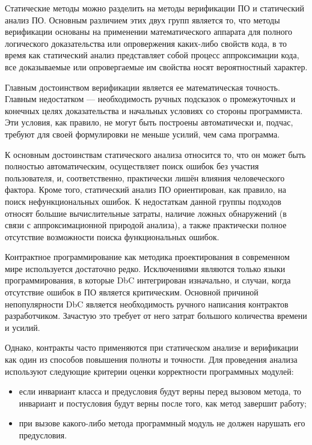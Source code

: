 Статические методы можно разделить на методы верификации ПО и статический анализ ПО. Основным различием этих двух групп является то, что методы верификации основаны на применении математического аппарата для полного логического доказательства или опровержения каких-либо свойств кода, в то время как статический анализ представляет собой процесс аппроксимации кода, все доказываемые или опровергаемые им свойства носят вероятностный характер.

Главным достоинством верификации является ее математическая точность. Главным недостатком --- необходимость ручных подсказок о промежуточных и конечных целях доказательства и начальных условиях со стороны программиста. Эти условия, как правило, не могут быть построены ав­томатически и, подчас, требуют для своей формулировки не меньше усилий, чем сама программа.

К основным достоинствам статического анали­за относится то, что он может быть полностью автоматическим, осуществляет поиск ошибок без участия пользователя, и, соответствен­но, практически лишён влияния человеческого фактора. Кроме того, статический анализ ПО ориентирован, как правило, на поиск нефункциональных ошибок. К недостаткам данной группы подходов относят большие вычислительные затраты, наличие ложных обнаружений (в связи с аппроксимационной природой анализа), а также практически полное отсутствие возможности поиска функциональных ошибок.

Контрактное программирование как методика проектирования в современном мире используется достаточно редко. Исключениями являются только языки программирования, в которые DbC интегрирован изначально, и случаи, когда отсутствие ошибок в ПО является критическим. Основной причиной непопулярности DbC является необходимость ручного написания контрактов разработчиком. Зачастую это требует от него затрат большого количества времени и усилий. 

Однако, контракты часто применяются при статическом анализе и верификации как один из способов повышения полноты и точности. Для проведения анализа используют следующие критерии оценки корректности программных модулей:
\begin{itemize}
\item если инвариант класса и предусловия будут верны перед вызовом метода, то инвариант и постусловия будут верны после того, как метод завершит работу;

\item при вызове какого-либо метода программный модуль не должен нарушать его предусловия.
\end{itemize}

